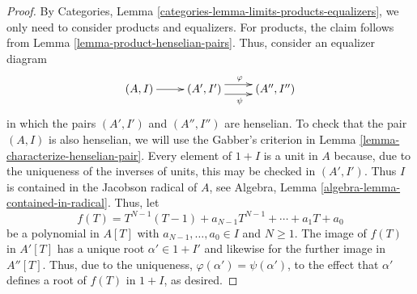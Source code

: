 \documentclass[10pt,a4paper]{amsart}
\theoremstyle{plain}
\theoremstyle{definition}
\theoremstyle{remark}
\numberwithin{equation}{subsection}
\begin{document}
\begin{proof}
By Categories, Lemma \ref{categories-lemma-limits-products-equalizers},
we only need to consider products and equalizers.
For products, the claim follows from
Lemma \ref{lemma-product-henselian-pairs}.
Thus, consider an equalizer diagram
$$
\xymatrix{
(A, I) \ar[r] & (A', I')
\ar@<1ex>[r]^{\varphi} \ar@<-1ex>[r]_{\psi}
&
(A'', I'')  
}
$$
in which the pairs $(A', I')$ and $(A'', I'')$ are henselian.
To check that the pair $(A, I)$ is also henselian, we will use the
Gabber's criterion in Lemma \ref{lemma-characterize-henselian-pair}.
Every element of $1 + I$ is a unit in $A$ because,
due to the uniqueness of the inverses of units,
this may be checked in $(A', I')$.
Thus $I$ is contained in the Jacobson radical of $A$, see
Algebra, Lemma \ref{algebra-lemma-contained-in-radical}.
Thus, let 
$$
f(T) = T^{N - 1}(T - 1) + a_{N - 1} T^{N - 1} + \dotsb + a_1 T + a_0
$$
be a polynomial in $A[T]$ with $a_{N - 1}, \dotsc, a_0 \in I$ and $N \ge 1$.
The image of $f(T)$ in $A'[T]$ has a unique root $\alpha' \in 1 + I'$
and likewise for the further image in $A''[T]$.
Thus, due to the uniqueness, $\varphi(\alpha') = \psi(\alpha')$,
to the effect that $\alpha'$ defines a root of $f(T)$ in $1 + I$, as desired.
\end{proof}
\end{document}
